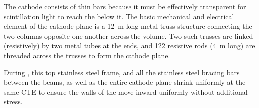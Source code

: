 
The  cathode consists of thin bars because it must be effectively transparent for scintillation light to reach the  below it. 
The basic mechanical and electrical element of the cathode plane is a \SI{12}{\m} long metal truss structure connecting the two  columns  opposite one another across the  volume.  Two such trusses are linked (resistively) by two metal tubes at the ends, and \num{122} resistive rods (\SI{4}{\m} long) are threaded across the trusses to form the cathode plane.  

During \cooldown, this top stainless steel frame, and all the stainless steel bracing bars between the   beams, as well as the entire cathode plane shrink uniformly at the same CTE to ensure the walls of the  move inward uniformly without additional stress.


